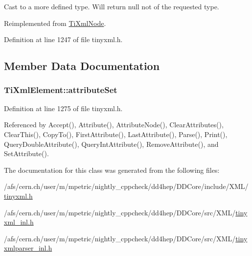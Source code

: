 Cast to a more defined type. Will return null not of the requested type. 

Reimplemented from \hyperlink{class_ti_xml_node_a72abed96dc9667ab9e0a2a275301bb1c}{TiXmlNode}.

Definition at line 1247 of file tinyxml.h.

\subsection{Member Data Documentation}
\hypertarget{class_ti_xml_element_a56d7e69380c3cc938bf213d2857791b2}{
\subsubsection[{attributeSet}]{ {\bf TiXmlElement::attributeSet}}}
\label{class_ti_xml_element_a56d7e69380c3cc938bf213d2857791b2}


Definition at line 1275 of file tinyxml.h.

Referenced by Accept(), Attribute(), AttributeNode(), ClearAttributes(), ClearThis(), CopyTo(), FirstAttribute(), LastAttribute(), Parse(), Print(), QueryDoubleAttribute(), QueryIntAttribute(), RemoveAttribute(), and SetAttribute().

The documentation for this class was generated from the following files:\begin{DoxyCompactItemize}
\item 
/afs/cern.ch/user/m/mpetric/nightly\_\-cppcheck/dd4hep/DDCore/include/XML/\hyperlink{tinyxml_8h}{tinyxml.h}\item 
/afs/cern.ch/user/m/mpetric/nightly\_\-cppcheck/dd4hep/DDCore/src/XML/\hyperlink{tinyxml__inl_8h}{tinyxml\_\-inl.h}\item 
/afs/cern.ch/user/m/mpetric/nightly\_\-cppcheck/dd4hep/DDCore/src/XML/\hyperlink{tinyxmlparser__inl_8h}{tinyxmlparser\_\-inl.h}\end{DoxyCompactItemize}
